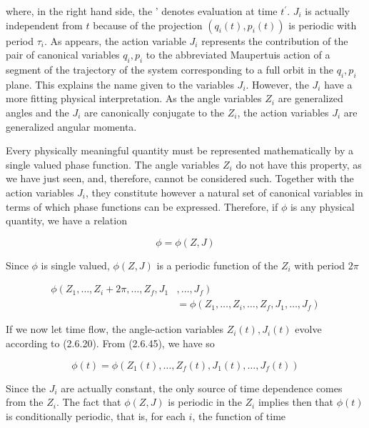 \documentclass{article}
\begin{document}
where, in the right hand side, the ' denotes evaluation at time $t^{\prime}$. $J_{i}$ is actually independent from $t$ because of the projection $\left(q_{i}(t), p_{i}(t)\right)$ is periodic with period $\tau_{i}$. As appears, the action variable $J_{i}$ represents the contribution of the pair of canonical variables $q_{i}, p_{i}$ to the abbreviated Maupertuis action of a segment of the trajectory of the system corresponding to a full orbit in the $q_{i}, p_{i}$ plane. This explains the name given to the variables $J_{i}$. However, the $J_{i}$ have a more fitting physical interpretation. As the angle variables $Z_{i}$ are generalized angles and the $J_{i}$ are canonically conjugate to the $Z_{i}$, the action variables $J_{i}$ are generalized angular momenta.

Every physically meaningful quantity must be represented mathematically by a single valued phase function. The angle variables $Z_{i}$ do not have this property, as we have just seen, and, therefore, cannot be considered such. Together with the action variables $J_{i}$, they constitute however a natural set of canonical variables in terms of which phase functions can be expressed. Therefore, if $\phi$ is any physical quantity, we have a relation
 
\begin{equation*}
\phi=\phi(Z, J) \tag{2.6.45}
\end{equation*}
 

Since $\phi$ is single valued, $\phi(Z, J)$ is a periodic function of the $Z_{i}$ with period $2 \pi$
 
\begin{align*}
\phi\left(Z_{1}, \ldots, Z_{i}+2 \pi, \ldots, Z_{f}, J_{1}\right. & \left., \ldots, J_{f}\right)  \tag{2.6.46}\\
& =\phi\left(Z_{1}, \ldots, Z_{i}, \ldots, Z_{f}, J_{1}, \ldots, J_{f}\right)
\end{align*}
 

If we now let time flow, the angle-action variables $Z_{i}(t), J_{i}(t)$ evolve according to (2.6.20). From (2.6.45), we have so
 
\begin{equation*}
\phi(t)=\phi\left(Z_{1}(t), \ldots, Z_{f}(t), J_{1}(t), \ldots, J_{f}(t)\right) \tag{2.6.47}
\end{equation*}
 

Since the $J_{i}$ are actually constant, the only source of time dependence comes from the $Z_{i}$. The fact that $\phi(Z, J)$ is periodic in the $Z_{i}$ implies then that $\phi(t)$ is conditionally periodic, that is, for each $i$, the function of time
 
\end{document}
